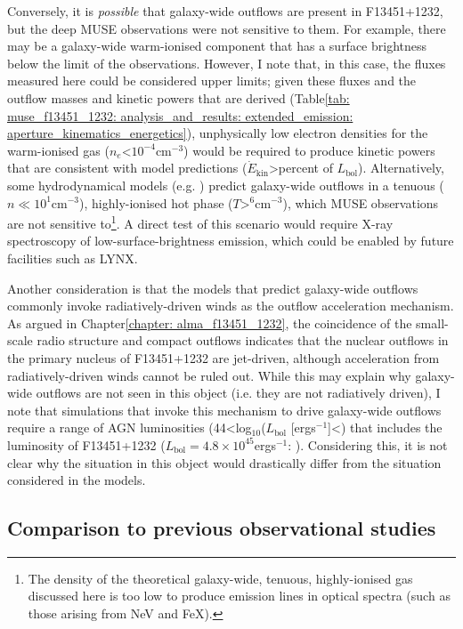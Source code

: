 Conversely, it is \textit{possible} that galaxy-wide outflows are present in F13451+1232, but the deep MUSE observations were not sensitive to them. For example, there may be a galaxy-wide warm-ionised component that has a surface brightness below the limit of the observations. However, I note that, in this case, the fluxes measured here could be considered upper limits; given these fluxes and the outflow masses and kinetic powers that are derived (Table\;\ref{tab: muse_f13451_1232: analysis_and_results: extended_emission: aperture_kinematics_energetics}), unphysically low electron densities for the warm-ionised gas ($n_e$\;\textless\;$10^{-4}$\;cm$^{-3}$) would be required to produce kinetic powers that are consistent with model predictions ($\dot{E}_\mathrm{kin}$\;\textgreater{}\;per\;cent of $L_\mathrm{bol}$). Alternatively, some hydrodynamical models (e.g. \citealt{Costa2015, Costa2018, Curtis2016, Barai2018}) predict galaxy-wide outflows in a tenuous ($n\ll10^1$\;cm$^{-3}$), highly-ionised hot phase ($T$\;\textgreater{}$^6$\;cm$^{-3}$), which MUSE observations are not sensitive to\footnote{The density of the theoretical galaxy-wide, tenuous, highly-ionised gas discussed here is too low to produce emission lines in optical spectra (such as those arising from Ne\;V and Fe\;X).}. A direct test of this scenario would require X-ray spectroscopy of low-surface-brightness emission, which could be enabled by future facilities such as LYNX.

Another consideration is that the models that predict galaxy-wide outflows commonly invoke radiatively-driven winds as the outflow acceleration mechanism. As argued in Chapter\;\ref{chapter: alma_f13451_1232}, the coincidence of the small-scale radio structure and compact outflows indicates that the nuclear outflows in the primary nucleus of F13451+1232 are jet-driven, although acceleration from radiatively-driven winds cannot be ruled out. While this may explain why galaxy-wide outflows are not seen in this object (i.e. they are not radiatively driven), I note that simulations that invoke this mechanism to drive galaxy-wide outflows require a range of AGN luminosities (44\;\textless\;log$_{10}$($L_\mathrm{bol}$ [erg\;s$^{-1}$]\;\textless{}) that includes the luminosity of F13451+1232 ($L_\mathrm{bol}=4.8\times10^{45}$\;erg\;s$^{-1}$: \citealt{Rose2018}). Considering this, it is not clear why the situation in this object would drastically differ from the situation considered in the models. 

\subsection{Comparison to previous observational studies}
\label{section: muse_f13451_1232: discussion: comparison_to_observational_studies}

